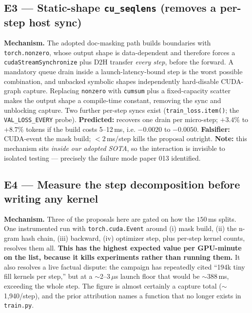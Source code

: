 \documentclass{article}
\begin{document}
\subsection{E3 --- Static-shape \texttt{cu\_seqlens} (removes a per-step host sync)}
\textbf{Mechanism.} The adopted doc-masking path builds boundaries with
\texttt{torch.nonzero}, whose output shape is data-dependent and therefore forces a
\texttt{cudaStreamSynchronize} plus D2H transfer \emph{every step}, before the forward. A
mandatory queue drain inside a launch-latency-bound step is the worst possible combination,
and unbacked symbolic shapes independently hard-disable CUDA-graph capture. Replacing
\texttt{nonzero} with \texttt{cumsum} plus a fixed-capacity scatter makes the output shape a
compile-time constant, removing the sync and unblocking capture. Two further per-step syncs
exist (\texttt{train\_loss.item()}; the \texttt{VAL\_LOSS\_EVERY} probe).
\textbf{Predicted:} recovers one drain per micro-step; $+3.4\%$ to $+8.7\%$ tokens if the
build costs 5--12\,ms, i.e. $-0.0020$ to $-0.0050$.
\textbf{Falsifier:} CUDA-event the mask build; ${<}2$\,ms/step kills the proposal outright.
\textbf{Note:} this mechanism sits \emph{inside our adopted SOTA}, so the interaction is
invisible to isolated testing --- precisely the failure mode paper 013 identified.

\subsection{E4 --- Measure the step decomposition before writing any kernel}
\textbf{Mechanism.} Three of the proposals here are gated on how the $150$\,ms splits. One
instrumented run with \texttt{torch.cuda.Event} around (i) mask build, (ii) the n-gram hash
chain, (iii) backward, (iv) optimizer step, plus per-step kernel counts, resolves them all.
\textbf{This has the highest expected value per GPU-minute on the list, because it kills
experiments rather than running them.} It also resolves a live factual dispute: the campaign
has repeatedly cited ``194k tiny fill kernels per step,'' but at a $\sim$2--3\,$\mu$s launch
floor that would be $\sim$388\,ms, exceeding the whole step. The figure is almost certainly a
capture total ($\sim$1{,}940/step), and the prior attribution names a function that no longer
exists in \texttt{train.py}.
\end{document}
